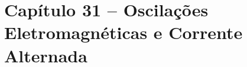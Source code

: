 \section{Capítulo 31 -- Oscilações Eletromagnéticas e Corrente Alternada}


\newpage

\newpage

\newpage

\newpage

\newpage

